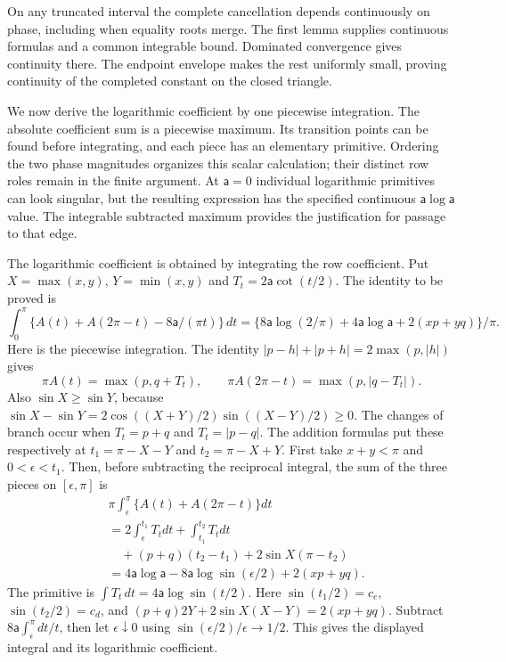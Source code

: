 On any truncated interval the complete cancellation depends
continuously on phase, including when equality roots merge. The first
lemma supplies continuous formulas and a common integrable bound.
Dominated convergence gives continuity there. The endpoint envelope
makes the rest uniformly small, proving continuity of the completed
constant on the closed triangle.

We now derive the logarithmic coefficient by one piecewise integration.
The absolute coefficient sum is a piecewise maximum. Its transition
points can be found before integrating, and each piece has an elementary
primitive. Ordering the two phase magnitudes organizes this scalar
calculation; their distinct row roles remain in the finite argument. At $\mathsf{a}=0$ individual logarithmic primitives can look
singular, but the resulting expression has the specified continuous
$\mathsf{a}\log \mathsf{a}$ value. The integrable subtracted maximum provides the
justification for passage to that edge.

The logarithmic coefficient is obtained by integrating the row coefficient.
Put $X=\max(x,y)$, $Y=\min(x,y)$ and $T_t=2\mathsf{a}\cot(t/2)$. The identity to be proved is
\[
 \int_0^\pi\{A(t)+A(2\pi-t)-8\mathsf{a}/(\pi t)\}\,dt
 =\{8\mathsf{a}\log(2/\pi)+4\mathsf{a}\log \mathsf{a}+2(xp+yq)\}/\pi.
\]
Here is the piecewise integration. The identity
$|p-h|+|p+h|=2\max(p,|h|)$ gives
\[
 \pi A(t)=\max(p,q+T_t),\qquad
 \pi A(2\pi-t)=\max(p,|q-T_t|).
\]
Also $\sin X\geq\sin Y$, because
$\sin X-\sin Y=2\cos((X+Y)/2)\sin((X-Y)/2)\geq0$.
The changes of branch occur when $T_t=p+q$ and $T_t=|p-q|$.
The addition formulas put these respectively at
$t_1=\pi-X-Y$ and $t_2=\pi-X+Y$. First take $x+y<\pi$ and
$0<\epsilon<t_1$. Then, before subtracting
the reciprocal integral, the sum of the three pieces on $[\epsilon,\pi]$
is
\[
 \begin{aligned}
 &\pi\int_\epsilon^\pi\{A(t)+A(2\pi-t)\}dt\\
 &=2\int_\epsilon^{t_1}T_tdt+\int_{t_1}^{t_2}T_tdt\\
 &\quad +(p+q)(t_2-t_1)+2\sin X(\pi-t_2)\\
 &=4\mathsf{a}\log \mathsf{a}-8\mathsf{a}\log\sin(\epsilon/2)+2(xp+yq).
 \end{aligned}
\]
The primitive is $\int T_t\,dt=4\mathsf a\log\sin(t/2)$.
Here $\sin(t_1/2)=c_e$, $\sin(t_2/2)=c_d$, and
$(p+q)2Y+2\sin X(X-Y)=2(xp+yq)$. Subtract
$8\mathsf{a}\int_\epsilon^\pi dt/t$, then let $\epsilon\downarrow0$ using
$\sin(\epsilon/2)/\epsilon\to1/2$. This gives the displayed
integral and its logarithmic coefficient.

